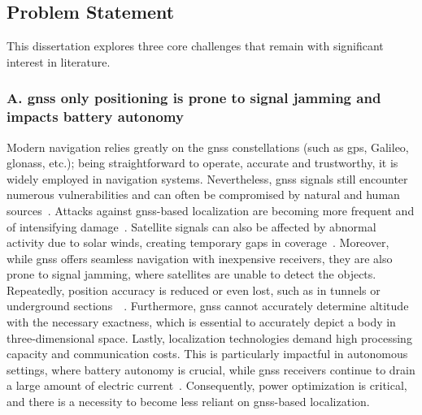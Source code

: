\subsection{Problem Statement}
This dissertation explores three core challenges that remain with significant interest in literature.

\subsubsection{A. \acrshort{gnss} only positioning is prone to signal jamming and impacts battery autonomy}
Modern navigation relies greatly on the \acrfull{gnss} constellations (such as \acrfull{gps}, Galileo, \acrshort{glonass}, etc.); being straightforward to operate, accurate and trustworthy, it is widely employed in navigation systems. Nevertheless, \acrshort{gnss} signals still encounter numerous vulnerabilities and can often be compromised by natural and human sources~\cite{ioannides2016known}. Attacks against \acrshort{gnss}-based localization are becoming more frequent and of intensifying damage~\cite{papadimitratos2008protection}. Satellite signals can also be affected by abnormal activity due to solar winds, creating temporary gaps in coverage~\cite{amin2016vulnerabilities}.
Moreover, while \acrshort{gnss} offers seamless navigation with inexpensive receivers, they are also prone to signal jamming, where satellites are unable to detect the objects. Repeatedly, position accuracy is reduced or even lost, such as in tunnels or underground sections~\cite{pinker1999vulnerability}~\cite{omar2016integration}. Furthermore, \acrshort{gnss} cannot accurately determine altitude with the necessary exactness, which is essential to accurately depict a body in three-dimensional space.
Lastly, localization technologies demand high processing capacity and communication costs. This is particularly impactful in autonomous settings, where battery autonomy is crucial, while \acrshort{gnss} receivers continue to drain a large amount of electric current~\cite{lo2016greener}. Consequently, power optimization is critical, and there is a necessity to become less reliant on \acrshort{gnss}-based localization.


